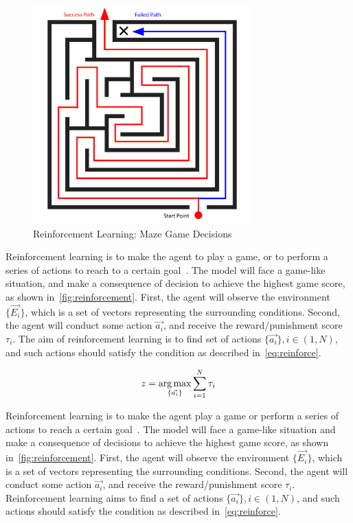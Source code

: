 \begin{spacing}{1.5}
\begin{figure}[ht]
\centering
\includegraphics[width=0.75\textwidth, fbox]{Chapter2/reinforcement.pdf}
\caption{Reinforcement Learning: Maze Game Decisions}
\label{fig:reinforcement} 
\end{figure}

Reinforcement learning is to make the agent to play a game, or to perform a series of actions to reach to a certain goal~\cite{barto2004reinforcement}. The model will face a game-like situation, and make a consequence of decision to achieve the highest game score, as shown in~\autoref{fig:reinforcement}. First, the agent will observe the environment $\{\vec{E_i}\}$, which is a set of vectors representing the surrounding conditions. Second, the agent will conduct some action $\vec{a_i}$, and receive the reward/punishment score $\tau_i$. The aim of reinforcement learning is to find set of actions $\{\vec{a_i}\}, i \in (1,N)$, and such actions should satisfy the condition as described in~\autoref{eq:reinforce}.

\begin{equation}
\label{eq:reinforce}
   z = \operatorname*{arg\,max}_{\{\vec{a_i}\}} \sum_{i=1}^{N} \tau_i
\end{equation}

Reinforcement learning is to make the agent play a game or perform a series of actions to reach a certain goal~\cite{barto2004reinforcement}. The model will face a game-like situation and make a consequence of decisions to achieve the highest game score, as shown in~\autoref{fig:reinforcement}. First, the agent will observe the environment $\{\vec{E_i}\}$, which is a set of vectors representing the surrounding conditions. Second, the agent will conduct some action $\vec{a_i}$, and receive the reward/punishment score $\tau_i$. Reinforcement learning aims to find a set of actions $\{\vec{a_i}\}, i \in (1,N)$, and such actions should satisfy the condition as described in~\autoref{eq:reinforce}.


\end{spacing}
